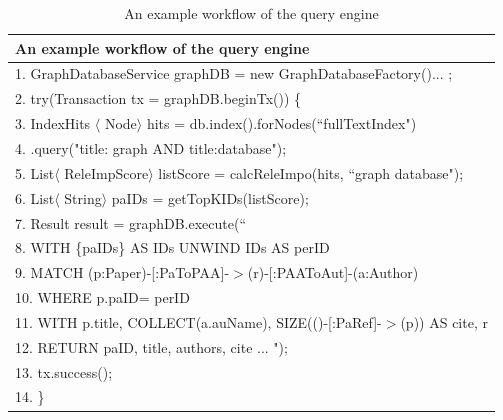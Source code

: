 \begin{table}[t!]
\caption{An example workflow of the query engine}
\label{tab-workflow}
\begin{scriptsize}
\begin{tabular}{ l}
\hline
{An example workflow of the query engine} \\
\hline
1. GraphDatabaseService graphDB = new GraphDatabaseFactory()... ; \\
2.  \hspace{0ex}  try(Transaction tx = graphDB.beginTx()) \{ \\
3.  \hspace{4ex} 	IndexHits $\langle$ Node$\rangle$ hits = db.index().forNodes(``fullTextIndex") \\
4.  \hspace{8ex}   .query("title: graph AND title:database"); \\
5.  \hspace{4ex} 	List$\langle$ ReleImpScore$\rangle$ listScore = calcReleImpo(hits, ``graph database"); \\
6.  \hspace{4ex} 	List$\langle$ String$\rangle$  paIDs = getTopKIDs(listScore); \\
7.  \hspace{4ex}    Result result = graphDB.execute(`` \\
8.  \hspace{8ex}		WITH \{paIDs\} AS IDs UNWIND IDs AS perID \\
9.  \hspace{8ex}		MATCH (p:Paper)-[:PaToPAA]-$>$(r)-[:PAAToAut]-(a:Author)\\
10.	\hspace{7ex}		WHERE p.paID= perID \\
11. \hspace{7ex}        WITH p.title,  COLLECT(a.auName), SIZE(()-[:PaRef]-$>$(p)) AS cite, r \\
12.	\hspace{7ex}		RETURN  paID, title, authors, cite ... ");\\
13.	\hspace{4ex}	    tx.success();\\
14. \hspace{2ex}  \} \\
\hline
\end{tabular} \\ %
\end{scriptsize}
\end{table}


